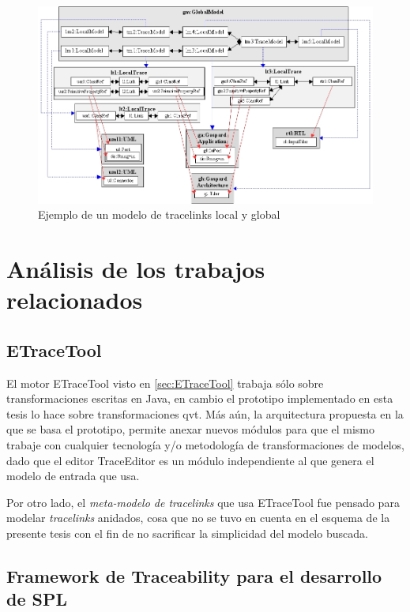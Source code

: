 \documentclass[a4paper,12pt,twoside,spanish,openright]{book}
\begin{document}
\begin{figure}[hbtp]
\centering
\includegraphics[scale=.46]{./img/EjemploLocalGlobalMetamodel}
\caption{Ejemplo de un modelo de tracelinks local y global}
\label{fig:EjemploLocalGlobalMetamodel}
\end{figure}



\section{Análisis de los trabajos relacionados}


\subsection*{ETraceTool}

El motor \textsf{ETraceTool} visto en \ref{sec:ETraceTool} trabaja sólo sobre transformaciones escritas en \textsf{Java}, en cambio el prototipo implementado en esta tesis lo hace sobre transformaciones \gls{qvt}. Más aún, la arquitectura propuesta en la que se basa el prototipo, permite anexar nuevos módulos para que el mismo trabaje con cualquier tecnología y/o metodología de transformaciones de modelos, dado que el editor \textsf{TraceEditor} es un módulo independiente al que genera el modelo de entrada que usa.

Por otro lado, el \textit{meta-modelo de tracelinks} que usa \textsf{ETraceTool} fue pensado para modelar \textit{tracelinks} anidados, cosa que no se tuvo en cuenta en el esquema de la presente tesis con el fin de no sacrificar la simplicidad del modelo buscada.


\subsection*{Framework de Traceability para el desarrollo de SPL}
\end{document}
